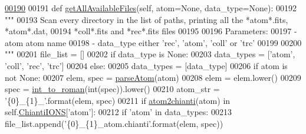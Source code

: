\begin{DoxyCode}
\hypertarget{classpyneb_1_1utils_1_1manage__atomic__data_1_1___manage_atomic_data_l00190}{}\hyperlink{classpyneb_1_1utils_1_1manage__atomic__data_1_1___manage_atomic_data_ac828c51afd39972cc4fb0f2b48617857}{00190} 
00191     \textcolor{keyword}{def }\hyperlink{classpyneb_1_1utils_1_1manage__atomic__data_1_1___manage_atomic_data_ac828c51afd39972cc4fb0f2b48617857}{getAllAvailableFiles}(self, atom=None, data\_type=None):
00192         \textcolor{stringliteral}{"""}
00193 \textcolor{stringliteral}{        Scan every directory in the list of paths, printing all the *atom*.fits, *atom*.dat,}
00194 \textcolor{stringliteral}{            *coll*.fits and *rec*.fits files}
00195 \textcolor{stringliteral}{            }
00196 \textcolor{stringliteral}{        Parameters:}
00197 \textcolor{stringliteral}{           - atom        atom name}
00198 \textcolor{stringliteral}{           - data\_type   either 'rec', 'atom', 'coll' or 'trc'}
00199 \textcolor{stringliteral}{}
00200 \textcolor{stringliteral}{        """}
00201         file\_list = []
00202         \textcolor{keywordflow}{if} data\_type \textcolor{keywordflow}{is} \textcolor{keywordtype}{None}:
00203             data\_types = [\textcolor{stringliteral}{'atom'}, \textcolor{stringliteral}{'coll'}, \textcolor{stringliteral}{'rec'}, \textcolor{stringliteral}{'trc'}]
00204         \textcolor{keywordflow}{else}:
00205             data\_types = [data\_type]
00206         \textcolor{keywordflow}{if} atom \textcolor{keywordflow}{is} \textcolor{keywordflow}{not} \textcolor{keywordtype}{None}:
00207             elem, spec = \hyperlink{namespacepyneb_1_1utils_1_1misc_a2bb6f906a75f26a882093e9ce9272507}{parseAtom}(atom)
00208             elem = elem.lower()
00209             spec = \hyperlink{namespacepyneb_1_1utils_1_1misc_a7a4c4b4ba1c884da72e0ea05aa8fb90b}{int\_to\_roman}(int(spec)).lower()
00210             atom\_str = \textcolor{stringliteral}{'\{0\}\_\{1\}\_'}.format(elem, spec)
00211             \textcolor{keywordflow}{if} \hyperlink{namespacepyneb_1_1utils_1_1manage__atomic__data_a2c05deb31d8bc74727659c88846651a1}{atom2chianti}(atom) \textcolor{keywordflow}{in} self.\hyperlink{classpyneb_1_1utils_1_1manage__atomic__data_1_1___manage_atomic_data_a06491f5f808df3d4e58b35e09db74a18}{ChiantiIONS}[\textcolor{stringliteral}{'atom'}]:
00212                 \textcolor{keywordflow}{if} \textcolor{stringliteral}{'atom'} \textcolor{keywordflow}{in} data\_types:
00213                     file\_list.append(\textcolor{stringliteral}{'\{0\}\_\{1\}\_atom.chianti'}.format(elem, spec))

\end{DoxyCode}
